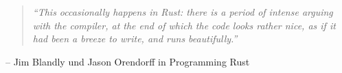 
\thispagestyle{empty}

\vspace*{\fill}

%
%


\begin{center}
	\begin{minipage}{.75\textwidth}
		\begin{quotation}
			\textit{\enquote{This occasionally happens in Rust: there is a period of intense arguing with the compiler, at the end of which the code looks rather nice, as if it had been a breeze to write, and runs beautifully.}}
		\end{quotation}
		\hfill \small{-- \textsf{Jim Blandly und Jason Orendorff in Programming Rust}}
	\end{minipage}
\end{center}

\vspace*{\fill}